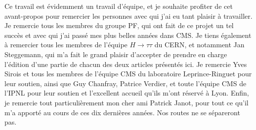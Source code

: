 Ce travail est évidemment un travail d'équipe, et je souhaite profiter de cet avant-propos pour remercier les personnes avec qui j'ai eu tant plaisir à travailler.  
Je remercie tous les membres du groupe PF, qui ont fait de ce projet un tel succès et avec qui j'ai passé mes plus belles années dans CMS.  
Je tiens également à remercier tous les membres de l'équipe $H \to \tau \tau$ du CERN, et notamment Jan Steggemann, qui m'a fait le grand plaisir d'accepter de prendre en charge l'édition d'une partie de chacun des deux articles présentés ici.  
Je remercie Yves Sirois et tous les membres de l'équipe CMS du laboratoire Leprince-Ringuet pour leur soutien, 
ainsi que Guy Chanfray, Patrice Verdier, et toute l'équipe CMS de l'IPNL pour leur soutien et l'excellent accueil qu'ils m'ont réservé à Lyon. 
Enfin, je remercie tout particulièrement mon cher ami Patrick Janot, pour tout ce qu'il m'a apporté au cours de ces dix dernières années. Nos routes ne se sépareront pas. 
